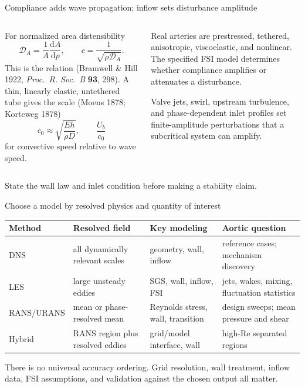 \documentclass[aspectratio=169,11pt]{beamer}
\newcommand{\Rey}{\mathrm{Re}}
\begin{document}
\begin{frame}{Compliance adds wave propagation; inflow sets disturbance amplitude}
\small
\begin{columns}[T,onlytextwidth]
\begin{column}{0.49\textwidth}
For normalized area distensibility
\[
  \mathcal D_A=\frac1A\frac{\mathrm dA}{\mathrm dp},
  \qquad
  c=\frac1{\sqrt{\rho\mathcal D_A}}.
\]
This is the  relation (Bramwell \& Hill 1922, \emph{Proc.\ R. Soc.\ B} \textbf{93}, 298).
A thin, linearly elastic, untethered tube gives the  scale (Moens 1878; Korteweg 1878)
\[
  c_0\approx\sqrt{\frac{Eh}{\rho D}},
  \qquad \frac{U_b}{c_0}
\]
for convective speed relative to wave speed.
\end{column}
\begin{column}{0.47\textwidth}
Real arteries are prestressed, tethered, anisotropic, viscoelastic, and nonlinear. The specified FSI model determines whether compliance amplifies or attenuates a disturbance.

Valve jets, swirl, upstream turbulence, and phase-dependent inlet profiles set finite-amplitude perturbations that a subcritical system can amplify.
\end{column}
\end{columns}

\begin{punchbox}
\centering
State the wall law and inlet condition before making a stability claim.
\end{punchbox}
\end{frame}

\begin{frame}{Choose a model by resolved physics and quantity of interest}
\small
\setlength{\tabcolsep}{3pt}
\begin{tabular}{@{}L{0.16\textwidth}L{0.24\textwidth}L{0.24\textwidth}L{0.27\textwidth}@{}}
\toprule
\textbf{Method} & \textbf{Resolved field} & \textbf{Key modeling} & \textbf{Aortic question}\\
\midrule
DNS & all dynamically relevant scales & geometry, wall, inflow & reference cases; mechanism discovery\\[3pt]
LES & large unsteady eddies & SGS, wall, inflow, FSI & jets, wakes, mixing, fluctuation statistics\\[3pt]
RANS/URANS & mean or phase-resolved mean & Reynolds stress, wall, transition & design sweeps; mean pressure and shear\\[3pt]
Hybrid & RANS region plus resolved eddies & grid/model interface, wall & high-$\Rey$ separated regions\\
\bottomrule
\end{tabular}

\vspace{0.65em}
\begin{punchbox}
There is no universal accuracy ordering. Grid resolution, wall treatment, inflow data, FSI assumptions, and validation against the chosen output all matter.
\end{punchbox}
\end{frame}
\end{document}
